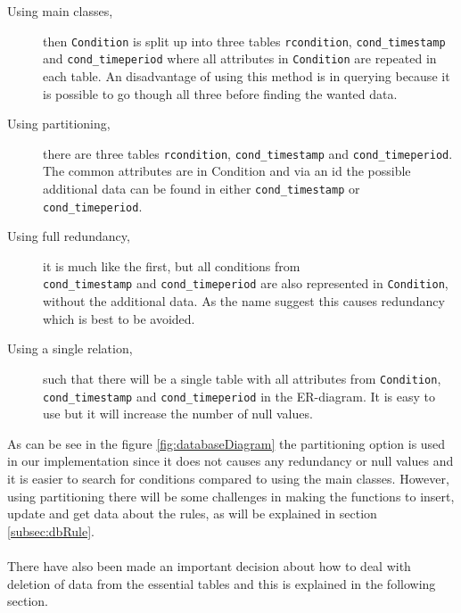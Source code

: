 \begin{description}
	\item[Using main classes,] then \texttt{Condition} is split up into three tables \texttt{rcondition}, \texttt{cond\_timestamp} and \texttt{cond\_timeperiod} where all attributes in \texttt{Condition} are repeated in each table. An disadvantage of using this method is in querying because it is possible to go though all three before finding the wanted data.
	\item[Using partitioning,] there are three tables \texttt{rcondition}, \texttt{cond\_timestamp} and \texttt{cond\_timeperiod}. The common attributes are in Condition and via an id the possible additional data can be found in either \texttt{cond\_timestamp} or \texttt{cond\_timeperiod}.
	\item[Using full redundancy,] it is much like the first, but all conditions from \\ \texttt{cond\_timestamp} and \texttt{cond\_timeperiod} are also represented in \texttt{Condition}, without the additional data. As the name suggest this causes redundancy which is best to be avoided.
	\item[Using a single relation,] such that there will be a single table with all attributes from \texttt{Condition}, \texttt{cond\_timestamp} and \texttt{cond\_timeperiod} in the ER-diagram. It is easy to use but it will increase the number of null values. 
\end{description}

As can be see in the figure \ref{fig:databaseDiagram} the partitioning option is used in our implementation since it does not causes any redundancy or null values and it is easier to search for conditions compared to using the main classes. However, using partitioning there will be some challenges in making the functions to insert, update and get data about the rules, as will be explained in section \vref{subsec:dbRule}.\\\\

There have also been made an important decision about how to deal with deletion of data from the essential tables and this is explained in the following section.
 
